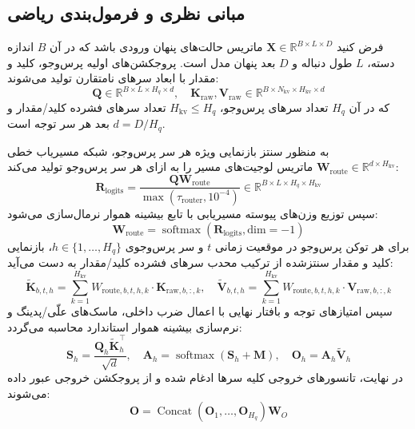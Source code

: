 \subsection{مبانی نظری و فرمول‌بندی ریاضی}
فرض کنید $\mathbf{X} \in \mathbb{R}^{B \times L \times D}$ ماتریس حالت‌های پنهان ورودی باشد که در آن $B$ اندازه دسته، $L$ طول دنباله و $D$ بعد پنهان مدل است. پروجکشن‌های اولیه پرس‌وجو، کلید و مقدار با ابعاد سرهای نامتقارن تولید می‌شوند:
\begin{equation}
\mathbf{Q} \in \mathbb{R}^{B \times L \times H_q \times d}, \quad \mathbf{K}_{\text{raw}}, \mathbf{V}_{\text{raw}} \in \mathbb{R}^{B \times N_{\text{kv}} \times H_{\text{kv}} \times d}
\end{equation}
که در آن $H_q$ تعداد سرهای پرس‌وجو، $H_{\text{kv}} \le H_q$ تعداد سرهای فشرده کلید/مقدار و $d = D / H_q$ بعد هر سر توجه است.

به منظور سنتز بازنمایی ویژه هر سر پرس‌وجو، شبکه مسیریاب خطی $\mathbf{W}_{\text{route}} \in \mathbb{R}^{d \times H_{\text{kv}}}$ ماتریس لوجیت‌های مسیر را به ازای هر سر پرس‌وجو تولید می‌کند:
\begin{equation}
\mathbf{R}_{\text{logits}} = \frac{\mathbf{Q} \mathbf{W}_{\text{route}}}{\max(\tau_{\text{router}}, 10^{-4})} \in \mathbb{R}^{B \times L \times H_q \times H_{\text{kv}}}
\end{equation}
سپس توزیع وزن‌های پیوسته مسیریابی با تابع بیشینه هموار نرمال‌سازی می‌شود:
\begin{equation}
\mathbf{W}_{\text{route}} = \operatorname{softmax}(\mathbf{R}_{\text{logits}}, \text{dim}=-1)
\end{equation}
برای هر توکن پرس‌وجو در موقعیت زمانی $t$ و سر پرس‌وجوی $h \in \{1, \dots, H_q\}$، بازنمایی کلید و مقدار سنتز‌شده از ترکیب محدب سرهای فشرده کلید/مقدار به دست می‌آید:
\begin{equation}
\tilde{\mathbf{K}}_{b, t, h} = \sum_{k=1}^{H_{\text{kv}}} W_{\text{route}, b, t, h, k} \cdot \mathbf{K}_{\text{raw}, b, :, k}, \quad \tilde{\mathbf{V}}_{b, t, h} = \sum_{k=1}^{H_{\text{kv}}} W_{\text{route}, b, t, h, k} \cdot \mathbf{V}_{\text{raw}, b, :, k}
\end{equation}
سپس امتیازهای توجه و بافتار نهایی با اعمال ضرب داخلی، ماسک‌های علّی/پدینگ و نرم‌سازی بیشینه هموار استاندارد محاسبه می‌گردد:
\begin{equation}
\mathbf{S}_h = \frac{\mathbf{Q}_h \tilde{\mathbf{K}}_h^\top}{\sqrt{d}}, \quad \mathbf{A}_h = \operatorname{softmax}(\mathbf{S}_h + \mathbf{M}), \quad \mathbf{O}_h = \mathbf{A}_h \tilde{\mathbf{V}}_h
\end{equation}
در نهایت، تانسورهای خروجی کلیه سرها ادغام شده و از پروجکشن خروجی عبور داده می‌شوند:
\begin{equation}
\mathbf{O} = \operatorname{Concat}(\mathbf{O}_1, \dots, \mathbf{O}_{H_q}) \mathbf{W}_O
\end{equation}


